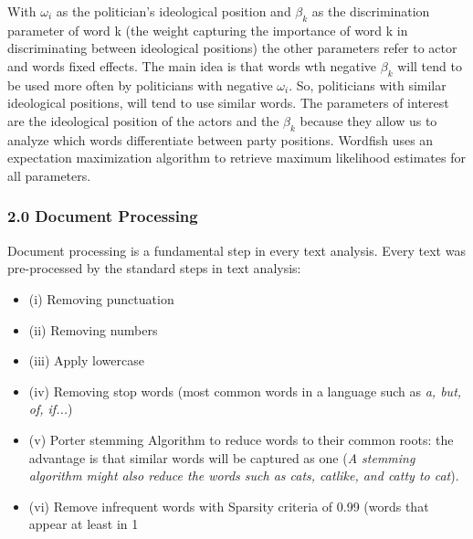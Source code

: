 \documentclass{article}
\begin{document}
With $\omega_i$ as the politician's ideological position and $\beta_k$ as the discrimination parameter of word k (the weight capturing the importance of word k in discriminating between ideological positions) the other parameters refer to actor and words fixed effects. The main idea is that words wth negative $\beta_k$ will tend to be used more often by politicians with negative  $\omega_i$. So, politicians with similar ideological positions, will tend to use similar words. The parameters of interest are the ideological position of the actors and the $\beta_k$ because they allow us to analyze which words differentiate between party positions. Wordfish uses an expectation maximization algorithm to retrieve maximum likelihood estimates for all parameters.  

 \subsubsection*{2.0 Document Processing}
 Document processing is a fundamental step in every text analysis. Every text was pre-processed by the standard steps in text analysis: 
 \begin{itemize}
 	\item[ ] (i) Removing punctuation
 	\item[ ] (ii) Removing numbers
 	\item[ ] (iii) Apply lowercase
 	\item[ ] (iv) Removing stop words (most common words in a language such as \textit{a, but, of, if...})
	\item[ ] (v) Porter stemming Algorithm to reduce words to their common roots: the advantage is that similar words will be captured as one (\textit{A stemming algorithm might also reduce the words such as cats, catlike, and catty to cat}). 
	\item[ ] (vi) Remove infrequent words with Sparsity criteria of 0.99 (words that appear at least in 1%
 \end{itemize}
\end{document}
